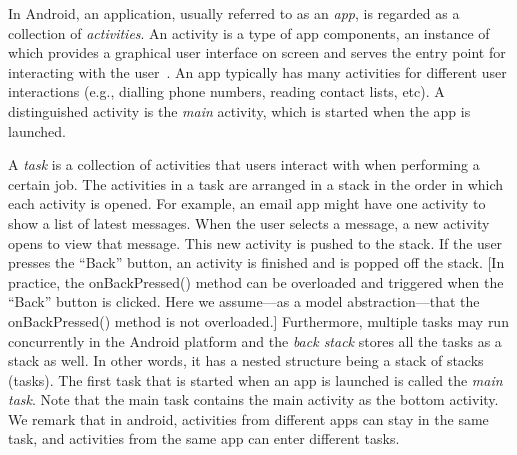 \documentclass[preprint,12pt]{elsarticle}
\newcommand{\zhilin}[1]{\color{blue} {ZL: #1 :LZ} \color{black}}
\newcommand{\tl}[1]{\color{magenta} {TL: #1 :LT} \color{black}}
\newcommand{\zhilin}[1]{}
\newcommand{\tl}[1]{}
\begin{document}
In Android, an application, usually referred to as an \emph{app}, is regarded as a collection of \emph{activities}. An activity is a type of app components, an instance of which provides a graphical user interface on screen and  serves the entry point for interacting with the user~\cite{Androiddoc}. An app typically has many activities for different user interactions (e.g., dialling phone numbers, reading contact lists, etc). A distinguished activity is the \emph{main} activity, which is started when the app is launched.
%
 
 
A \emph{task} is a collection of activities that users interact with when performing a certain job.
The activities in a task are arranged in a stack %
in the order in which each activity is opened. For example, an email app might have one activity to show a list of latest messages. When the user selects a message, a new activity opens to view that message. This new activity is pushed to the stack. If the user presses the ``Back'' button, an activity is finished and is popped off the stack. [In practice, the onBackPressed() method can be overloaded and triggered when the ``Back'' button is clicked. Here we assume---as a model abstraction---that the onBackPressed() method is not overloaded.]
Furthermore, multiple tasks may run concurrently in the Android platform and the \emph{back stack} stores all the tasks as a stack as well. In other words, it has a nested structure being a stack of stacks (tasks). The first task that is started when an app is launched is called the \emph{main task}. Note that the main task contains the main activity as the bottom activity. 
%
We remark that %
in android, activities from different apps can stay in the same task, and activities from the same app can enter different tasks.
\end{document}
